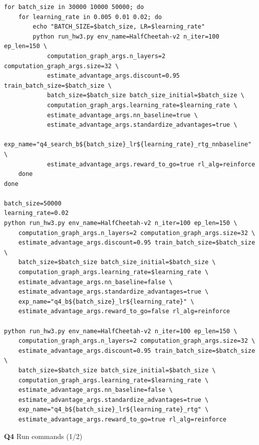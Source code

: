\documentclass[11pt]{article}
\begin{document}
\begin{listing}[htbp]
\begin{verbatim}
for batch_size in 30000 10000 50000; do
    for learning_rate in 0.005 0.01 0.02; do
        echo "BATCH_SIZE=$batch_size, LR=$learning_rate"
        python run_hw3.py env_name=HalfCheetah-v2 n_iter=100 ep_len=150 \
            computation_graph_args.n_layers=2 computation_graph_args.size=32 \
            estimate_advantage_args.discount=0.95 train_batch_size=$batch_size \
            batch_size=$batch_size batch_size_initial=$batch_size \
            computation_graph_args.learning_rate=$learning_rate \
            estimate_advantage_args.nn_baseline=true \
            estimate_advantage_args.standardize_advantages=true \
            exp_name="q4_search_b${batch_size}_lr${learning_rate}_rtg_nnbaseline" \
            estimate_advantage_args.reward_to_go=true rl_alg=reinforce
    done
done

batch_size=50000
learning_rate=0.02
python run_hw3.py env_name=HalfCheetah-v2 n_iter=100 ep_len=150 \
    computation_graph_args.n_layers=2 computation_graph_args.size=32 \
    estimate_advantage_args.discount=0.95 train_batch_size=$batch_size \
    batch_size=$batch_size batch_size_initial=$batch_size \
    computation_graph_args.learning_rate=$learning_rate \
    estimate_advantage_args.nn_baseline=false \
    estimate_advantage_args.standardize_advantages=true \
    exp_name="q4_b${batch_size}_lr${learning_rate}" \
    estimate_advantage_args.reward_to_go=false rl_alg=reinforce

python run_hw3.py env_name=HalfCheetah-v2 n_iter=100 ep_len=150 \
    computation_graph_args.n_layers=2 computation_graph_args.size=32 \
    estimate_advantage_args.discount=0.95 train_batch_size=$batch_size \
    batch_size=$batch_size batch_size_initial=$batch_size \
    computation_graph_args.learning_rate=$learning_rate \
    estimate_advantage_args.nn_baseline=false \
    estimate_advantage_args.standardize_advantages=true \
    exp_name="q4_b${batch_size}_lr${learning_rate}_rtg" \
    estimate_advantage_args.reward_to_go=true rl_alg=reinforce

\end{verbatim}
\caption{\textbf{Q4} Run commands (1/2)}
\end{listing}
\end{document}
